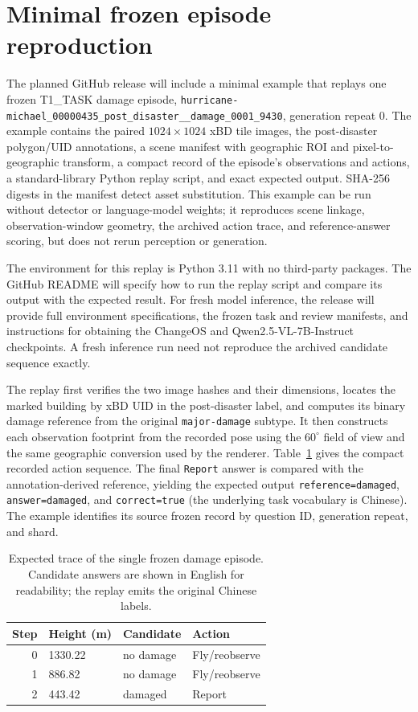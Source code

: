 \section{Minimal frozen episode reproduction}
\label{app:minimal-reproduction}
\setcounter{table}{0}
\renewcommand{\theHtable}{B.\arabic{table}}
The planned GitHub release will include a minimal example that replays one frozen T1\_TASK damage episode, \nolinkurl{hurricane-michael_00000435_post_disaster__damage_0001_9430}, generation repeat 0. The example contains the paired $1024\times1024$ xBD tile images, the post-disaster polygon/UID annotations, a scene manifest with geographic ROI and pixel-to-geographic transform, a compact record of the episode's observations and actions, a standard-library Python replay script, and exact expected output. SHA-256 digests in the manifest detect asset substitution. This example can be run without detector or language-model weights; it reproduces scene linkage, observation-window geometry, the archived action trace, and reference-answer scoring, but does not rerun perception or generation.

The environment for this replay is Python 3.11 with no third-party packages. The GitHub README will specify how to run the replay script and compare its output with the expected result. For fresh model inference, the release will provide full environment specifications, the frozen task and review manifests, and instructions for obtaining the ChangeOS and Qwen2.5-VL-7B-Instruct checkpoints. A fresh inference run need not reproduce the archived candidate sequence exactly.

The replay first verifies the two image hashes and their dimensions, locates the marked building by xBD UID in the post-disaster label, and computes its binary damage reference from the original \texttt{major-damage} subtype. It then constructs each observation footprint from the recorded pose using the $60^\circ$ field of view and the same geographic conversion used by the renderer. Table~\ref{tab:minimal-episode-trace} gives the compact recorded action sequence. The final \texttt{Report} answer is compared with the annotation-derived reference, yielding the expected output \texttt{reference=damaged}, \texttt{answer=damaged}, and \texttt{correct=true} (the underlying task vocabulary is Chinese). The example identifies its source frozen record by question ID, generation repeat, and shard.

\begin{table}[htbp]
\centering\small
\caption{Expected trace of the single frozen damage episode. Candidate answers are shown in English for readability; the replay emits the original Chinese labels.}
\label{tab:minimal-episode-trace}
\begin{tabular}{@{}rlll@{}}
\toprule
Step & Height (m) & Candidate & Action\\
\midrule
0 & 1330.22 & no damage & Fly/reobserve\\
1 & 886.82 & no damage & Fly/reobserve\\
2 & 443.42 & damaged & Report\\
\bottomrule
\end{tabular}
\end{table}

